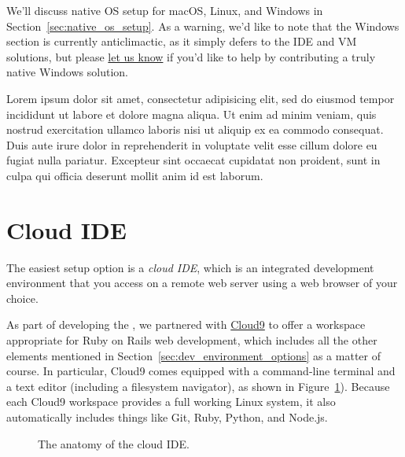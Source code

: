 We'll discuss native OS setup for macOS, Linux, and Windows in Section~\ref{sec:native_os_setup}. As a warning, we'd like to note that the Windows section is currently anticlimactic, as it simply defers to the IDE and VM solutions, but please \href{mailto:support@learnenough.com}{let us know} if you'd like to help by contributing a truly native Windows solution.

\begin{aside}
\label{aside:technical_sophistication}

Lorem ipsum dolor sit amet, consectetur adipisicing elit, sed do eiusmod
tempor incididunt ut labore et dolore magna aliqua. Ut enim ad minim veniam,
quis nostrud exercitation ullamco laboris nisi ut aliquip ex ea commodo
consequat. Duis aute irure dolor in reprehenderit in voluptate velit esse
cillum dolore eu fugiat nulla pariatur. Excepteur sint occaecat cupidatat non
proident, sunt in culpa qui officia deserunt mollit anim id est laborum.

\end{aside}


\section{Cloud IDE}
\label{sec:cloud_ide}

The easiest setup option is a \emph{cloud IDE}, which is an integrated development environment that you access on a remote web server using a web browser of your choice.

As part of developing the \rort, we partnered with \href{http://c9.io/}{Cloud9} to offer a workspace appropriate for Ruby on Rails web development, which includes all the other elements mentioned in Section~\ref{sec:dev_environment_options} as a matter of course. In particular, Cloud9 comes equipped with a command-line terminal and a text editor (including a filesystem navigator), as shown in Figure~\ref{fig:ide_anatomy}). Because each Cloud9 workspace provides a full working Linux system, it also automatically includes things like Git, Ruby, Python, and Node.js.

\begin{figure}
\begin{center}
\end{center}
\caption{The anatomy of the cloud IDE.\label{fig:ide_anatomy}}
\end{figure}

